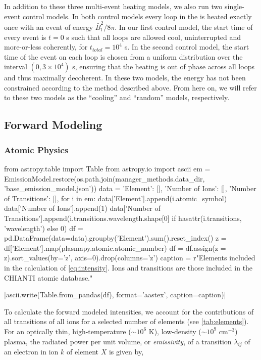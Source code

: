 In addition to these three multi-event heating models, we also run two single-event control models. In both control models every loop in the \AR{} is heated exactly once with an event of energy $\bar{B}_l^2/8\pi$. In our first control model, the start time of every event is $t=0$ s such that all loops are allowed cool, uninterrupted and more-or-less coherently, for $t_{total}=10^4$ s. In the second control model, the start time of the event on each loop is chosen from a uniform distribution over the interval $(0, 3\times10^4)$ s, ensuring that the heating is out of phase across all loops and thus maximally decoherent. In these two models, the energy has not been constrained according to the method described above. From here on, we will refer to these two models as the ``cooling'' and ``random'' models, respectively.

\subsection{Forward Modeling}\label{forward}

\subsubsection{Atomic Physics}\label{atomic}

\begin{pycode}
from astropy.table import Table
from astropy.io import ascii
em = EmissionModel.restore(os.path.join(manager_methods.data_dir, 'base_emission_model.json'))
data = {'Element': [], 'Number of Ions': [], 'Number of Transitions': [],}
for i in em:
    data['Element'].append(i.atomic_symbol)
    data['Number of Ions'].append(1)
    data['Number of Transitions'].append(i.transitions.wavelength.shape[0] if hasattr(i.transitions, 'wavelength') else 0)
df = pd.DataFrame(data=data).groupby('Element').sum().reset_index()
z = df['Element'].map(plasmapy.atomic.atomic_number)
df = df.assign(z = z).sort_values(by='z', axis=0).drop(columns='z')
caption = r"Elements included in the calculation of \autoref{eq:intensity}. Ions and transitions are those included in the CHIANTI atomic database.\label{tab:elements}"
\end{pycode}
|ascii.write(Table.from_pandas(df), format='aastex', caption=caption)|

To calculate the forward modeled intensities, we account for the contributions of all transitions of all ions for a selected number of elements (see \autoref{tab:elements}). For an optically thin, high-temperature ($\sim10^6$ K), low-density ($\sim10^9$ cm$^{-3}$) plasma, the radiated power per unit volume, or \textit{emissivity}, of a transition $\lambda_{ij}$ of an electron in ion $k$ of element $X$ is given by,

